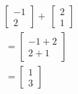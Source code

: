 \documentclass[preview]{standalone}
\begin{document}
\begin{align*}
\begin{bmatrix}-1\\2\end{bmatrix}+\
                \begin{bmatrix}2\\1\end{bmatrix}\\ \
                =\begin{bmatrix}-1+2\\2+1\end{bmatrix}\\ \
                    =\begin{bmatrix}1\\3\end{bmatrix}
\end{align*}
\end{document}
